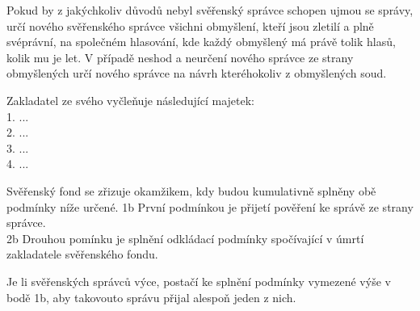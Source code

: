 \documentclass[parskip=half]{scrreprt}
\begin{document}
\begin{contract}
Pokud by z jakýchkoliv důvodů nebyl svěřenský správce schopen ujmou se správy, určí nového svěřenského správce všichni obmyšlení, kteří jsou zletilí a plně svéprávní, na společném hlasování, kde každý obmyšlený má právě tolik hlasů, kolik mu je let. V případě neshod a neurčení nového správce ze strany obmyšlených určí nového správce na návrh kteréhokoliv z obmyšlených soud.

Zakladatel ze svého vyčleňuje následující majetek:\\
1. ...\\
2. ...\\
3. ...\\
4. ...\\




Svěřenský fond se zřizuje okamžikem, kdy budou kumulativně splněny obě podmínky níže určené.
1b První podmínkou je přijetí pověření ke správě ze strany správce.\\
2b Drouhou pomínku je splnění odkládací podmínky spočívající v úmrtí zakladatele svěřenského fondu.


Je li svěřenských správců výce, postačí ke splnění podmínky vymezené výše v bodě 1b, aby takovouto správu přijal alespoň jeden z nich.



\end{contract}
\end{document}
